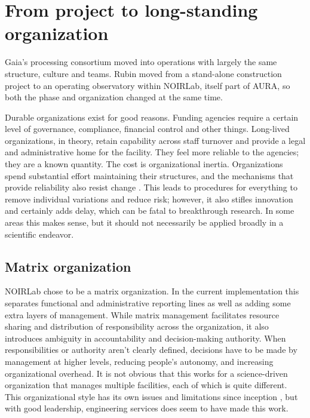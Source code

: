\section{From project to long-standing organization}
\label{sec:organisation}

Gaia's processing consortium moved into operations with largely the same structure, culture and teams.
Rubin moved from a stand-alone construction project to an operating observatory within NOIRLab, itself part of AURA,
so both the phase and organization changed at the same time.

Durable organizations exist for good reasons.
Funding agencies require a certain level of governance, compliance, financial control and other things.
Long-lived organizations, in theory, retain capability across staff turnover and provide a legal and administrative home for the facility.
They feel more reliable to the agencies; they are a known quantity.
The cost is organizational inertia.
Organizations spend substantial effort maintaining their structures, and the mechanisms that provide reliability also resist change
\citep{e6805d07-4fd7-31d0-9779-42b323de329b,10.2307/2094928,10.4102/sajip.v24i2.652,organizationalinertia2023review}.
This leads to procedures for everything to remove individual variations and reduce risk;
however, it also stifles innovation and certainly adds delay, which can be fatal to breakthrough research.
In some areas this makes sense, but it should not necessarily be applied broadly in a scientific endeavor.

\subsection{Matrix organization}
\label{sec:matrix}

NOIRLab chose to be a matrix organization. In the current implementation this separates functional and administrative reporting lines as well as adding some extra layers of management.
While matrix management facilitates resource sharing and distribution of responsibility across the organization, it also introduces ambiguity in accountability and decision-making authority.
When responsibilities or authority aren't clearly defined, decisions have to be made by management at higher levels, reducing people's autonomy, and increasing organizational overhead.
It is not obvious that this works for a science-driven organization that manages multiple facilities, each of which is quite different.
This organizational style has its own issues and limitations since inception \citep{Davis1978}, but with good leadership, engineering services does seem to have made this work.

